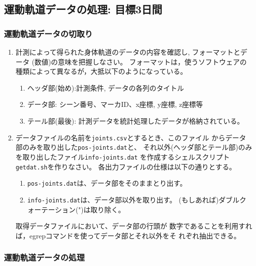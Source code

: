 \documentclass{jsarticle}
\begin{document}
\subsection{運動軌道データの処理: 目標3日間}
\subsubsection{運動軌道データの切取り}

\begin{enumerate}
\item 計測によって得られた身体軌道のデータの内容を確認し, フォーマットとデータ
  (数値)の意味を把握しなさい。
  フォーマットは，使うソフトウェアの種類によって異なるが，大抵以下のようになっている。
  \begin{enumerate}
  \item ヘッダ部(始め):計測条件, データの各列のタイトル
  \item データ部: シーン番号、マーカID、x座標, y座標, z座標等
  \item テール部(最後): 計測データを統計処理したデータが格納されている。
  \end{enumerate}
\item データファイルの名前を\verb|joints.csv|とするとき、このファイル
  からデータ部のみを取り出した\verb|pos-joints.dat|と、
  それ以外(ヘッダ部とテール部)のみを取り出したファイル\verb|info-joints.dat|
  を作成するシェルスクリプト\verb|getdat.sh|を作りなさい。
  各出力ファイルの仕様は以下の通りとする。
  \begin{enumerate}
  \item \verb|pos-joints.dat|は、データ部をそのままとり出す。
  \item \verb|info-joints.dat|は、データ部以外を取り出す。
    (もしあれば)ダブルクォーテーション(")は取り除く。
  \end{enumerate}
  取得データファイルにおいて、データ部の行頭が
  数字であることを利用すれば，egrepコマンドを使ってデータ部とそれ以外をそ
  れぞれ抽出できる。
\end{enumerate}


\subsubsection{運動軌道データの処理}
\end{document}
